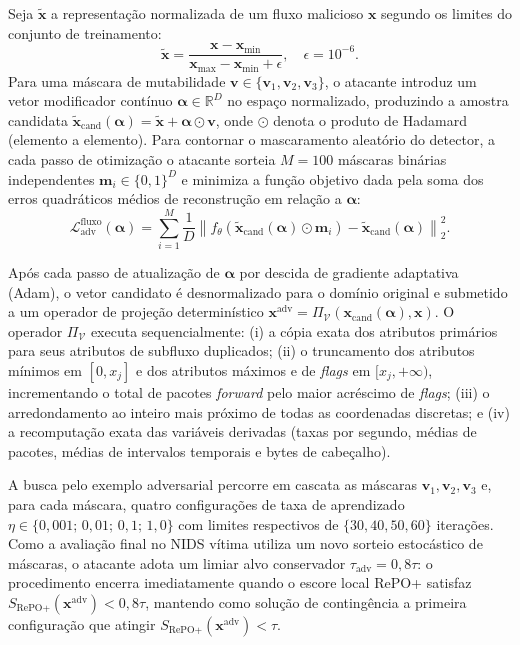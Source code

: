\documentclass[conference]{IEEEtran}
\begin{document}
Seja $\tilde{\mathbf{x}}$ a representação normalizada de um fluxo malicioso $\mathbf{x}$ segundo os limites do conjunto de treinamento:
\begin{equation}
\tilde{\mathbf{x}} = \frac{\mathbf{x} - \mathbf{x}_{\min}}{\mathbf{x}_{\max} - \mathbf{x}_{\min} + \epsilon}, \quad \epsilon = 10^{-6}.
\label{eq:norm_fluxo}
\end{equation}
Para uma máscara de mutabilidade $\mathbf{v} \in \{\mathbf{v}_1, \mathbf{v}_2, \mathbf{v}_3\}$, o atacante introduz um vetor modificador contínuo $\boldsymbol{\alpha} \in \mathbb{R}^{D}$ no espaço normalizado, produzindo a amostra candidata $\tilde{\mathbf{x}}_{\text{cand}}(\boldsymbol{\alpha}) = \tilde{\mathbf{x}} + \boldsymbol{\alpha} \odot \mathbf{v}$, onde $\odot$ denota o produto de Hadamard (elemento a elemento).
Para contornar o mascaramento aleatório do detector, a cada passo de otimização o atacante sorteia $M = 100$ máscaras binárias independentes $\mathbf{m}_i \in \{0, 1\}^{D}$ e minimiza a função objetivo dada pela soma dos erros quadráticos médios de reconstrução em relação a $\boldsymbol{\alpha}$:
\begin{equation}
\mathcal{L}_{\text{adv}}^{\text{fluxo}}(\boldsymbol{\alpha}) = \sum_{i=1}^{M} \frac{1}{D} \left\| f_{\theta}\!\left(\tilde{\mathbf{x}}_{\text{cand}}(\boldsymbol{\alpha}) \odot \mathbf{m}_i\right) - \tilde{\mathbf{x}}_{\text{cand}}(\boldsymbol{\alpha}) \right\|_2^2.
\label{eq:loss_adv_fluxo}
\end{equation}

Após cada passo de atualização de $\boldsymbol{\alpha}$ por descida de gradiente adaptativa (Adam), o vetor candidato é desnormalizado para o domínio original e submetido a um operador de projeção determinístico $\mathbf{x}^{\text{adv}} = \Pi_{\mathcal{V}}(\mathbf{x}_{\text{cand}}(\boldsymbol{\alpha}), \mathbf{x})$.
O operador $\Pi_{\mathcal{V}}$ executa sequencialmente: (i) a cópia exata dos atributos primários para seus atributos de subfluxo duplicados; (ii) o truncamento dos atributos mínimos em $[0, x_j]$ e dos atributos máximos e de \textit{flags} em $[x_j, +\infty)$, incrementando o total de pacotes \textit{forward} pelo maior acréscimo de \textit{flags}; (iii) o arredondamento ao inteiro mais próximo de todas as coordenadas discretas; e (iv) a recomputação exata das variáveis derivadas (taxas por segundo, médias de pacotes, médias de intervalos temporais e bytes de cabeçalho).

A busca pelo exemplo adversarial percorre em cascata as máscaras $\mathbf{v}_1, \mathbf{v}_2, \mathbf{v}_3$ e, para cada máscara, quatro configurações de taxa de aprendizado $\eta \in \{0{,}001;\, 0{,}01;\, 0{,}1;\, 1{,}0\}$ com limites respectivos de $\{30, 40, 50, 60\}$ iterações.
Como a avaliação final no NIDS vítima utiliza um novo sorteio estocástico de máscaras, o atacante adota um limiar alvo conservador $\tau_{\text{adv}} = 0{,}8\tau$: o procedimento encerra imediatamente quando o escore local RePO+ satisfaz $S_{\text{RePO+}}(\mathbf{x}^{\text{adv}}) < 0{,}8\tau$, mantendo como solução de contingência a primeira configuração que atingir $S_{\text{RePO+}}(\mathbf{x}^{\text{adv}}) < \tau$.
\end{document}
